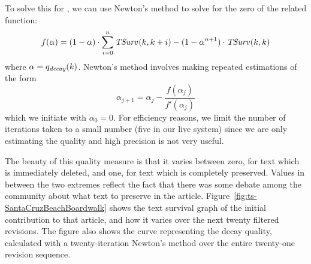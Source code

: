 To solve this for , we can use Newton's method
to solve for the zero of the related function:
\begin{equation*}
  f(\alpha) = (1 - \alpha) \cdot \sum_{i=0}^n \mathit{TSurv}_{}(k,k+i)
        - (1 - \alpha^{n+1}) \cdot \mathit{TSurv}_{}(k,k)
\end{equation*}
where $\alpha = q_\mathit{decay}(k)$.
Newton's method involves making repeated estimations of the form
\begin{equation*}
  \alpha_{j+1} = \alpha_j - \frac{f(\alpha_j)}{f'(\alpha_j)}
\end{equation*}
which we initiate with $\alpha_0 = 0$.
For efficiency reasons, we limit the number of iterations taken
to a small number (five in our live system)
since we are only estimating the quality and high precision
is not very useful.

The beauty of this quality measure is that it varies between
zero, for text which is immediately deleted, and one, for text
which is completely preserved.
Values in between the two extremes reflect the fact that there
was some debate among the community about what text to preserve
in the article.
Figure~\ref{fig:ts-SantaCruzBeachBoardwalk} shows the text survival
graph of the initial contribution to that article, and how it varies
over the next twenty filtered revisions.
The figure also shows the curve representing the decay quality,
calculated with a twenty-iteration Newton's method over the entire
twenty-one revision sequence.


